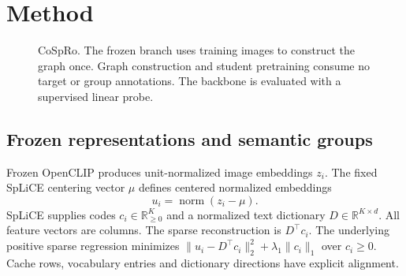 \documentclass{article}
\begin{document}
\section{Method}
\begin{figure}[htbp]
\centering
{}
\caption{CoSpRo. The frozen branch uses training images to construct the
graph once. Graph construction and student pretraining consume no target or
group annotations. The backbone is evaluated with a supervised linear probe.}
\label{fig:architecture}
\end{figure}
\subsection{Frozen representations and semantic groups}
Frozen OpenCLIP produces unit-normalized image embeddings $z_i$. The fixed SpLiCE centering vector $\mu$
defines centered normalized embeddings
\begin{equation}
 u_i=\operatorname{norm}(z_i-\mu).
\end{equation}
SpLiCE supplies codes $c_i\in\mathbb{R}^{K}_{\geq0}$ and a normalized text dictionary
$D\in\mathbb{R}^{K\times d}$. All feature vectors are columns. The sparse
reconstruction is $D^\top c_i$. The underlying positive sparse regression
minimizes $\|u_i-D^\top c_i\|_2^2+\lambda_1\|c_i\|_1$ over $c_i\geq0$.
Cache rows, vocabulary entries and dictionary directions have explicit alignment.
\end{document}
